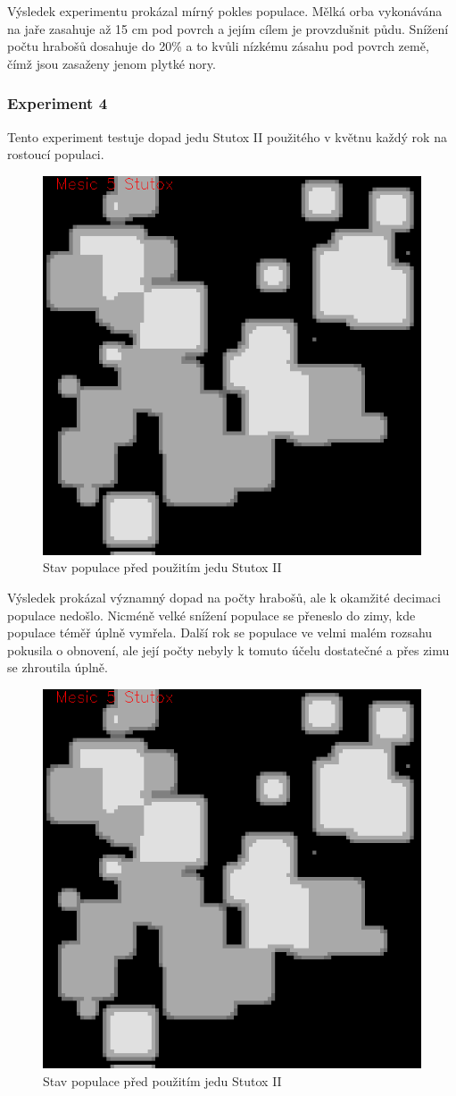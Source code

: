 \documentclass[a4paper,11pt]{article}
\begin{document}
Výsledek experimentu prokázal mírný pokles populace. Mělká orba vykonávána na jaře zasahuje až 15 cm pod povrch a jejím cílem je provzdušnit půdu. Snížení počtu hrabošů dosahuje do 20\% a to kvůli nízkému zásahu pod povrch země, čímž jsou zasaženy jenom plytké nory. 

\newpage
\subsubsection{Experiment 4}
Tento experiment testuje dopad jedu Stutox II použitého v květnu každý rok na rostoucí populaci.

\begin{figure}[h]
\begin{center}
    \includegraphics[width=.4\linewidth]{stutox5.png}
    \caption{Stav populace před použitím jedu Stutox II}
    \label{exp4_obr1}
\end{center}
\end{figure}

Výsledek prokázal významný dopad na počty hrabošů, ale k okamžité decimaci populace nedošlo. Nicméně velké snížení populace se přeneslo do zimy, kde populace téměř úplně vymřela. Další rok se populace ve velmi malém rozsahu pokusila o obnovení, ale její počty nebyly k tomuto účelu dostatečné a přes zimu se zhroutila úplně.

\begin{figure}[h]
\begin{center}
    \includegraphics[width=.4\linewidth]{stutox5.png}
    \caption{Stav populace před použitím jedu Stutox II}
    \label{exp4_obr2}
\end{center}
\end{figure}
\end{document}
